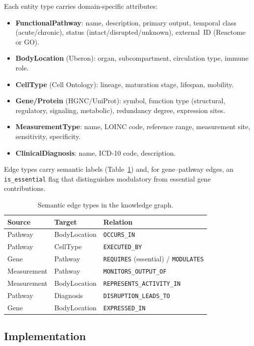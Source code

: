 \documentclass[12pt,a4paper]{article}
\begin{document}
Each entity type carries domain-specific attributes:

\begin{itemize}
    \item \textbf{FunctionalPathway}: name, description, primary output, temporal class (acute/chronic), status (intact/disrupted/unknown), external~ID (Reactome or GO).
    \item \textbf{BodyLocation} (Uberon): organ, subcompartment, circulation type, immune role.
    \item \textbf{CellType} (Cell Ontology): lineage, maturation stage, lifespan, mobility.
    \item \textbf{Gene/Protein} (HGNC/UniProt): symbol, function type (structural, regulatory, signaling, metabolic), redundancy degree, expression sites.
    \item \textbf{MeasurementType}: name, LOINC code, reference range, measurement site, sensitivity, specificity.
    \item \textbf{ClinicalDiagnosis}: name, ICD-10 code, description.
\end{itemize}

Edge types carry semantic labels (Table~\ref{tab:edges}) and, for gene--pathway edges, an \texttt{is\_essential} flag that distinguishes modulatory from essential gene contributions.

\begin{table}[H]
\centering
\caption{Semantic edge types in the knowledge graph.}
\label{tab:edges}
\begin{tabular}{lll}
\toprule
\textbf{Source} & \textbf{Target} & \textbf{Relation} \\
\midrule
Pathway & BodyLocation & \texttt{OCCURS\_IN} \\
Pathway & CellType & \texttt{EXECUTED\_BY} \\
Gene & Pathway & \texttt{REQUIRES} (essential) / \texttt{MODULATES} \\
Measurement & Pathway & \texttt{MONITORS\_OUTPUT\_OF} \\
Measurement & BodyLocation & \texttt{REPRESENTS\_ACTIVITY\_IN} \\
Pathway & Diagnosis & \texttt{DISRUPTION\_LEADS\_TO} \\
Gene & BodyLocation & \texttt{EXPRESSED\_IN} \\
\bottomrule
\end{tabular}
\end{table}

\subsection{Implementation}
\label{sec:implementation}
\end{document}
